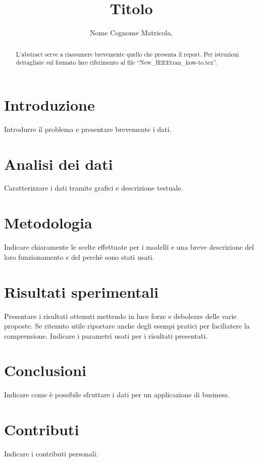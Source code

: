 \documentclass[lettersize,journal]{IEEEtran}
\begin{document}
\title{Titolo}

\author{Nome Cognome Matricola,}

\maketitle

\begin{abstract}
L'abstract serve a riassumere brevemente quello che presenta il report. Per istruzioni dettagliate sul formato fare riferimento al file ``New\_IEEEtran\_how-to.tex''.
\end{abstract}

\section{Introduzione}
Introdurre il problema e presentare brevemente i dati.

\section{Analisi dei dati}
Caratterizzare i dati tramite grafici e descrizione testuale.

\section{Metodologia}
Indicare chiaramente le scelte effettuate per i modelli e una breve descrizione del loro funzionamento e del perchè sono stati usati. 

\section{Risultati sperimentali}
Presentare i risultati ottenuti mettendo in luce forze e debolezze delle varie proposte. Se ritenuto utile riportare anche degli esempi pratici per faciliatere la comprensione. Indicare i parametri usati per i risultati presentati.

\section{Conclusioni}
Indicare come è possibile sfruttare i dati per un applicazione di business.

\section{Contributi}
Indicare i contributi personali.
\end{document}
